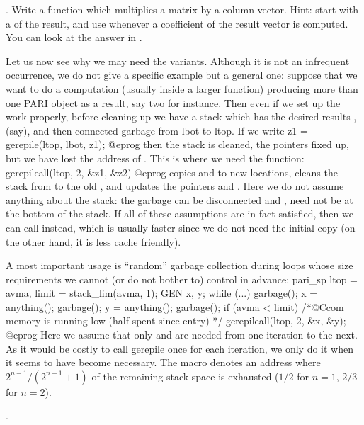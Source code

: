 . Write a function which multiplies a matrix by a column
vector. Hint: start with a  of the result, and use 
whenever a coefficient of the result vector is computed. You can look at the
answer in .


Let us now see why we may need the  variants. Although it
is not an infrequent occurrence, we do not give a specific example but a
general one: suppose that we want to do a computation (usually inside a
larger function) producing more than one PARI object as a result, say two for
instance. Then even if we set up the work properly, before cleaning up we
have a stack which has the desired results ,  (say), and
then connected garbage from lbot to ltop. If we write
\bprog
  z1 = gerepile(ltop, lbot, z1);
@eprog\noindent
then the stack is cleaned, the pointers fixed up, but we have lost the
address of . This is where we need the 
function:
\bprog
  gerepileall(ltop, 2, &z1, &z2)
@eprog
\noindent copies  and  to new locations, cleans the stack
from  to the old , and updates the pointers  and
. Here we do not assume anything about the stack: the garbage can be
disconnected and ,  need not be at the bottom of the stack.
If all of these assumptions are in fact satisfied, then we can call
 instead, which is usually faster since we do not need
the initial copy (on the other hand, it is less cache friendly).

A most important usage is ``random'' garbage collection during loops
whose size requirements we cannot (or do not bother to) control in advance:
\bprog
  pari_sp ltop = avma, limit = stack_lim(avma, 1);
  GEN x, y;
  while (...)
  {
    garbage(); x = anything();
    garbage(); y = anything(); garbage();
    if (avma < limit) /*@Ccom memory is running low (half spent since entry) */
      gerepileall(ltop, 2, &x, &y);
  }
@eprog
\noindent Here we assume that only  and  are needed from one
iteration to the next. As it would be costly to call gerepile once for each
iteration, we only do it when it seems to have become necessary. The macro
 denotes an address where $2^{n-1} /
(2^{n-1}+1)$ of the remaining stack space is exhausted ($1/2$ for $n=1$,
$2/3$ for $n=2$).

.

